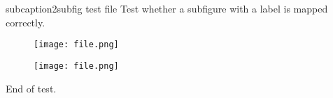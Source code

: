 subcaption2subfig test file
Test whether a subfigure with a label is mapped correctly.

\begin{subfigure}
    \label{fig:somelabl}
    \texttt{[image: file.png]}
\end{subfigure}

\begin{subfigure}
    \label{fig:somelabl}
    \texttt{[image: file.png]}
    \label{anotherlabel}
\end{subfigure}

End of test.
